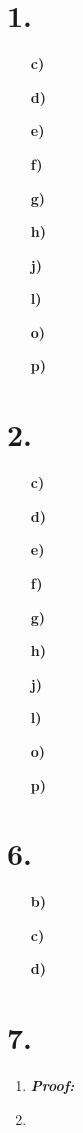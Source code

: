 \documentclass[12pt,letterpaper]{article}
\begin{document}
\section*{1.}


\begin{enumerate}[label= \textbf{\alph*)}]
	\item[\textbf{c)}]
	\item[\textbf{d)}]
	\item[\textbf{e)}]
	\item[\textbf{f)}]
	\item[\textbf{g)}]
	\item[\textbf{h)}]
	\item[\textbf{j)}] 
	\item[\textbf{l)}] 
	\item[\textbf{o)}]
	\item[\textbf{p)}]  
\end{enumerate}


\section*{2.}
\begin{enumerate}[label= \textbf{\alph*)}]
	\item[\textbf{c)}]
	\item[\textbf{d)}]
	\item[\textbf{e)}]
	\item[\textbf{f)}]
	\item[\textbf{g)}]
	\item[\textbf{h)}]
	\item[\textbf{j)}] 
	\item[\textbf{l)}]  
	\item[\textbf{o)}]
	\item[\textbf{p)}]
\end{enumerate}

\section*{6.}
\begin{enumerate}[label= \textbf{\alph*)}]
	\item[\textbf{b)}]
	\item[\textbf{c)}]
	\item[\textbf{d)}]  
\end{enumerate}

\section*{7.}
\begin{enumerate}[label= \textbf{\alph*)}]
	\item \textbf{\textit{Proof:}}
	\item 
\end{enumerate}
\end{document}
